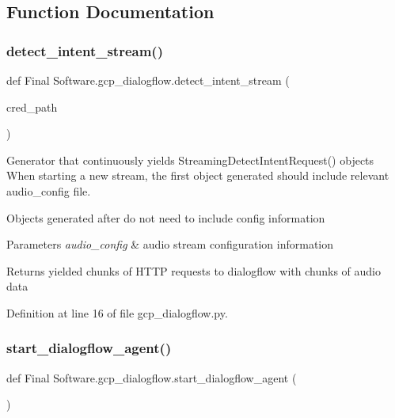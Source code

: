 \subsection{Function Documentation}
\mbox{\label{namespace_final_01_software_1_1gcp__dialogflow_a1a58277a90ed2e7295caa4ae6acf23de}} 
\subsubsection{detect\_intent\_stream()}
{\footnotesize\ttfamily def Final Software.\+gcp\+\_\+dialogflow.\+detect\+\_\+intent\+\_\+stream (\begin{DoxyParamCaption}\item[{}]{cred\+\_\+path }\end{DoxyParamCaption})}



Generator that continuously yields Streaming\+Detect\+Intent\+Request() objects When starting a new stream, the first object generated should include relevant audio\+\_\+config file. 

Objects generated after do not need to include config information 
\begin{DoxyParams}{Parameters}
{\em audio\+\_\+config} & audio stream configuration information \\
\hline
\end{DoxyParams}
\begin{DoxyReturn}{Returns}
yielded chunks of H\+T\+TP requests to dialogflow with chunks of audio data 
\end{DoxyReturn}


Definition at line 16 of file gcp\+\_\+dialogflow.\+py.

\mbox{\label{namespace_final_01_software_1_1gcp__dialogflow_a2010572c811f973f2529c4c0164d93e7}} 
\subsubsection{start\_dialogflow\_agent()}
{\footnotesize\ttfamily def Final Software.\+gcp\+\_\+dialogflow.\+start\+\_\+dialogflow\+\_\+agent (\begin{DoxyParamCaption}{ }\end{DoxyParamCaption})}



